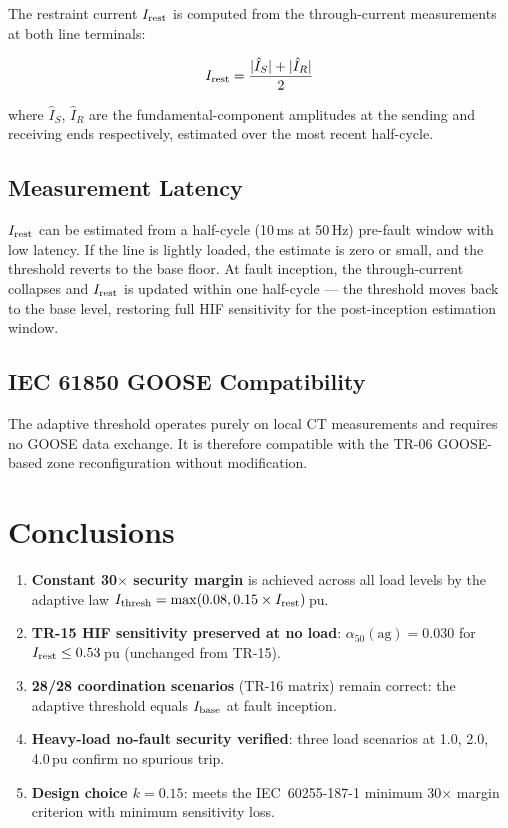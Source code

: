 \documentclass[11pt, a4paper]{article}
\begin{document}
The restraint current $I_{\rm rest}$ is computed from the through-current
measurements at both line terminals:

\begin{equation}
  I_{\rm rest} = \frac{|\hat{I}_S| + |\hat{I}_R|}{2}
\end{equation}

where $\hat{I}_S$, $\hat{I}_R$ are the fundamental-component amplitudes
at the sending and receiving ends respectively, estimated over the most
recent half-cycle.

\subsection{Measurement Latency}

$I_{\rm rest}$ can be estimated from a half-cycle (10\,ms at 50\,Hz) pre-fault
window with low latency.  If the line is lightly loaded, the estimate is
zero or small, and the threshold reverts to the base floor.  At fault
inception, the through-current collapses and $I_{\rm rest}$ is updated
within one half-cycle --- the threshold moves back to the base level,
restoring full HIF sensitivity for the post-inception estimation window.

\subsection{IEC 61850 GOOSE Compatibility}

The adaptive threshold operates purely on local CT measurements and requires
no GOOSE data exchange.  It is therefore compatible with the TR-06 GOOSE-based
zone reconfiguration without modification.


\section{Conclusions}
\label{sec:conclusions}

\begin{enumerate}
  \item \textbf{Constant 30$\times$ security margin} is achieved across all
        load levels by the adaptive law
        $I_{\rm thresh} = \max(0.08, 0.15 \times I_{\rm rest})$\,pu.
  \item \textbf{TR-15 HIF sensitivity preserved at no load}:
        $\alpha_{50}(\text{ag}) = 0.030$ for $I_{\rm rest} \leq 0.53$\,pu
        (unchanged from TR-15).
  \item \textbf{28/28 coordination scenarios} (TR-16 matrix) remain correct:
        the adaptive threshold equals $I_{\rm base}$ at fault inception.
  \item \textbf{Heavy-load no-fault security verified}: three load scenarios
        at 1.0, 2.0, 4.0\,pu confirm no spurious trip.
  \item \textbf{Design choice $k=0.15$}: meets the IEC~60255-187-1 minimum
        30$\times$ margin criterion with minimum sensitivity loss.
\end{enumerate}
\end{document}
